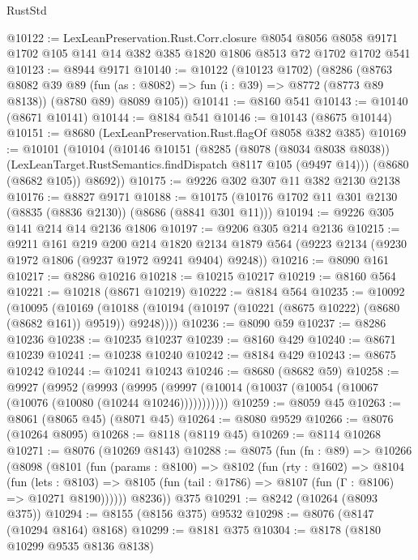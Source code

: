 \begin{lexlean}{RustStd}
\begin{coremodule}
@10122 := LexLeanPreservation.Rust.Corr.closure
    @8054
    @8056
    @8058
    @9171
    @1702
    @105
    @141
    @14
    @382
    @385
    @1820
    @1806
    @8513
    @72
    @1702
    @1702
    @541
@10123 := @8944 @9171
@10140 := @10122
    (@10123 @1702)
    (@8286
      (@8763
        @8082
        @39
        @89
        (fun (as : @8082) => fun (i : @39) => @8772 (@8773 @89 @8138))
        (@8780 @89)
        @8089
        @105))
@10141 := @8160 @541
@10143 := @10140 (@8671 @10141)
@10144 := @8184 @541
@10146 := @10143 (@8675 @10144)
@10151 := @8680 (LexLeanPreservation.Rust.flagOf @8058 @382 @385)
@10169 := @10101
    (@10104
      (@10146
        @10151
        (@8285
          (@8078 (@8034 @8038 @8038))
          (LexLeanTarget.RustSemantics.findDispatch @8117 @105 (@9497 @14)))
        (@8680 (@8682 @105))
        @8692))
@10175 := @9226 @302 @307 @11 @382 @2130 @2138
@10176 := @8827 @9171
@10188 := @10175 (@10176 @1702 @11 @301 @2130 (@8835 (@8836 @2130)) (@8686 (@8841 @301 @11)))
@10194 := @9226 @305 @141 @214 @14 @2136 @1806
@10197 := @9206 @305 @214 @2136
@10215 := @9211
    @161
    @219
    @200
    @214
    @1820
    @2134
    @1879
    @564
    (@9223 @2134 (@9230 @1972 @1806 (@9237 @1972 @9241 @9404) @9248))
@10216 := @8090 @161
@10217 := @8286 @10216
@10218 := @10215 @10217
@10219 := @8160 @564
@10221 := @10218 (@8671 @10219)
@10222 := @8184 @564
@10235 := @10092
    (@10095
      (@10169 (@10188 (@10194 (@10197 (@10221 (@8675 @10222) (@8680 (@8682 @161)) @9519)) @9248))))
@10236 := @8090 @59
@10237 := @8286 @10236
@10238 := @10235 @10237
@10239 := @8160 @429
@10240 := @8671 @10239
@10241 := @10238 @10240
@10242 := @8184 @429
@10243 := @8675 @10242
@10244 := @10241 @10243
@10246 := @8680 (@8682 @59)
@10258 := @9927
    (@9952
      (@9993 (@9995 (@9997 (@10014 (@10037 (@10054 (@10067 (@10076 (@10080 (@10244 @10246)))))))))))
@10259 := @8059 @45
@10263 := @8061 (@8065 @45) (@8071 @45)
@10264 := @8080 @9529
@10266 := @8076 (@10264 @8095)
@10268 := @8118 (@8119 @45)
@10269 := @8114 @10268
@10271 := @8076 (@10269 @8143)
@10288 := @8075
    (fun (fn : @89) =>
    @10266
      (@8098
        (@8101
          (fun (params : @8100) =>
          @8102
            (fun (rty : @1602) =>
            @8104
              (fun (lets : @8103) =>
              @8105 (fun (tail : @1786) => @8107 (fun (Γ : @8106) => @10271 @8190))))))
        @8236))
    @375
@10291 := @8242 (@10264 (@8093 @375))
@10294 := @8155 (@8156 @375) @9532
@10298 := @8076 (@8147 (@10294 @8164) @8168)
@10299 := @8181 @375
@10304 := @8178 (@8180 @10299 @9535 @8136 @8138)

\end{coremodule}
\end{lexlean}
